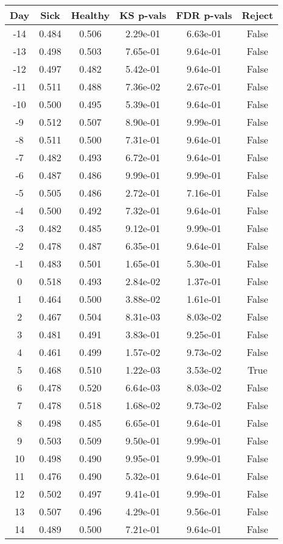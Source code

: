 \begin{tabular}{c|c|c|c|c|c}
Day &  Sick & Healthy &  KS p-vals & FDR p-vals & Reject\\
\hline
-14 & 0.484 &   0.506 &   2.29e-01 &   6.63e-01 &  False\\
-13 & 0.498 &   0.503 &   7.65e-01 &   9.64e-01 &  False\\
-12 & 0.497 &   0.482 &   5.42e-01 &   9.64e-01 &  False\\
-11 & 0.511 &   0.488 &   7.36e-02 &   2.67e-01 &  False\\
-10 & 0.500 &   0.495 &   5.39e-01 &   9.64e-01 &  False\\
 -9 & 0.512 &   0.507 &   8.90e-01 &   9.99e-01 &  False\\
 -8 & 0.511 &   0.500 &   7.31e-01 &   9.64e-01 &  False\\
 -7 & 0.482 &   0.493 &   6.72e-01 &   9.64e-01 &  False\\
 -6 & 0.487 &   0.486 &   9.99e-01 &   9.99e-01 &  False\\
 -5 & 0.505 &   0.486 &   2.72e-01 &   7.16e-01 &  False\\
 -4 & 0.500 &   0.492 &   7.32e-01 &   9.64e-01 &  False\\
 -3 & 0.482 &   0.485 &   9.12e-01 &   9.99e-01 &  False\\
 -2 & 0.478 &   0.487 &   6.35e-01 &   9.64e-01 &  False\\
 -1 & 0.483 &   0.501 &   1.65e-01 &   5.30e-01 &  False\\
  0 & 0.518 &   0.493 &   2.84e-02 &   1.37e-01 &  False\\
  1 & 0.464 &   0.500 &   3.88e-02 &   1.61e-01 &  False\\
  2 & 0.467 &   0.504 &   8.31e-03 &   8.03e-02 &  False\\
  3 & 0.481 &   0.491 &   3.83e-01 &   9.25e-01 &  False\\
  4 & 0.461 &   0.499 &   1.57e-02 &   9.73e-02 &  False\\
  5 & 0.468 &   0.510 &   1.22e-03 &   3.53e-02 &   True\\
  6 & 0.478 &   0.520 &   6.64e-03 &   8.03e-02 &  False\\
  7 & 0.478 &   0.518 &   1.68e-02 &   9.73e-02 &  False\\
  8 & 0.498 &   0.485 &   6.65e-01 &   9.64e-01 &  False\\
  9 & 0.503 &   0.509 &   9.50e-01 &   9.99e-01 &  False\\
 10 & 0.498 &   0.490 &   9.95e-01 &   9.99e-01 &  False\\
 11 & 0.476 &   0.490 &   5.32e-01 &   9.64e-01 &  False\\
 12 & 0.502 &   0.497 &   9.41e-01 &   9.99e-01 &  False\\
 13 & 0.507 &   0.496 &   4.29e-01 &   9.56e-01 &  False\\
 14 & 0.489 &   0.500 &   7.21e-01 &   9.64e-01 &  False\\
\end{tabular}